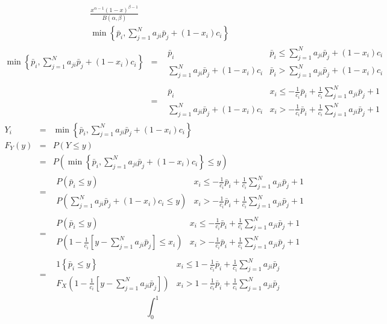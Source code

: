 \documentclass{article}
\begin{document}
\begin{eqnarray*}
&&\frac{x^{\alpha -1}\left( 1-x\right) ^{\beta -1}}{B\left( \alpha ,\beta
\right) } \\
&&\min \left\{ \bar{p}_{i},\sum_{j=1}^{N}a_{ji}\bar{p}_{j}+\left(
1-x_{i}\right) c_{i}\right\} 
\end{eqnarray*}%
\begin{eqnarray*}
\min \left\{ \bar{p}_{i},\sum_{j=1}^{N}a_{ji}\bar{p}_{j}+\left(
1-x_{i}\right) c_{i}\right\}  &=&%
\begin{array}{cc}
\bar{p}_{i} & \bar{p}_{i}\leq \sum_{j=1}^{N}a_{ji}\bar{p}_{j}+\left(
1-x_{i}\right) c_{i} \\ 
\sum_{j=1}^{N}a_{ji}\bar{p}_{j}+\left( 1-x_{i}\right) c_{i} & \bar{p}%
_{i}>\sum_{j=1}^{N}a_{ji}\bar{p}_{j}+\left( 1-x_{i}\right) c_{i}%
\end{array}
\\
&=&%
\begin{array}{cc}
\bar{p}_{i} & x_{i}\leq -\frac{1}{c_{i}}\bar{p}_{i}+\frac{1}{c_{i}}%
\sum_{j=1}^{N}a_{ji}\bar{p}_{j}+1 \\ 
\sum_{j=1}^{N}a_{ji}\bar{p}_{j}+\left( 1-x_{i}\right) c_{i} & x_{i}>-\frac{1%
}{c_{i}}\bar{p}_{i}+\frac{1}{c_{i}}\sum_{j=1}^{N}a_{ji}\bar{p}_{j}+1%
\end{array}%
\end{eqnarray*}%
\begin{eqnarray*}
Y_{i} &=&\min \left\{ \bar{p}_{i},\sum_{j=1}^{N}a_{ji}\bar{p}_{j}+\left(
1-x_{i}\right) c_{i}\right\}  \\
F_{Y}\left( y\right)  &=&P\left( Y\leq y\right)  \\
&=&P\left( \min \left\{ \bar{p}_{i},\sum_{j=1}^{N}a_{ji}\bar{p}_{j}+\left(
1-x_{i}\right) c_{i}\right\} \leq y\right)  \\
&=&%
\begin{array}{cc}
P\left( \bar{p}_{i}\leq y\right)  & x_{i}\leq -\frac{1}{c_{i}}\bar{p}_{i}+%
\frac{1}{c_{i}}\sum_{j=1}^{N}a_{ji}\bar{p}_{j}+1 \\ 
P\left( \sum_{j=1}^{N}a_{ji}\bar{p}_{j}+\left( 1-x_{i}\right) c_{i}\leq
y\right)  & x_{i}>-\frac{1}{c_{i}}\bar{p}_{i}+\frac{1}{c_{i}}%
\sum_{j=1}^{N}a_{ji}\bar{p}_{j}+1%
\end{array}
\\
&=&%
\begin{array}{cc}
P\left( \bar{p}_{i}\leq y\right)  & x_{i}\leq -\frac{1}{c_{i}}\bar{p}_{i}+%
\frac{1}{c_{i}}\sum_{j=1}^{N}a_{ji}\bar{p}_{j}+1 \\ 
P\left( 1-\frac{1}{c_{i}}\left[ y-\sum_{j=1}^{N}a_{ji}\bar{p}_{j}\right]
\leq x_{i}\right)  & x_{i}>-\frac{1}{c_{i}}\bar{p}_{i}+\frac{1}{c_{i}}%
\sum_{j=1}^{N}a_{ji}\bar{p}_{j}+1%
\end{array}
\\
&=&%
\begin{array}{cc}
1\left\{ \bar{p}_{i}\leq y\right\}  & x_{i}\leq 1-\frac{1}{c_{i}}\bar{p}_{i}+%
\frac{1}{c_{i}}\sum_{j=1}^{N}a_{ji}\bar{p}_{j} \\ 
F_{X}\left( 1-\frac{1}{c_{i}}\left[ y-\sum_{j=1}^{N}a_{ji}\bar{p}_{j}\right]
\right)  & x_{i}>1-\frac{1}{c_{i}}\bar{p}_{i}+\frac{1}{c_{i}}%
\sum_{j=1}^{N}a_{ji}\bar{p}_{j}%
\end{array}%
\end{eqnarray*}%
\[
\int_{0}^{1}
\]
\end{document}
